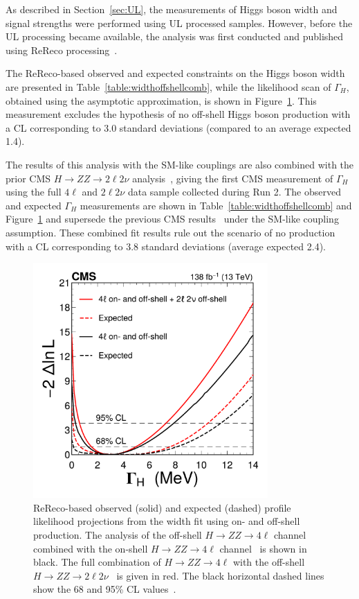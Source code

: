 As described in Section~\ref{sec:UL}, the measurements of Higgs boson width and signal strengths were performed using UL processed samples. However, before the UL processing became available, the analysis was first conducted and published using ReReco processing~\cite{PhysRevD.111.092014}. 

The ReReco-based observed and expected constraints on the Higgs boson width are presented in Table~\ref{table:widthoffshellcomb}, while the likelihood scan of $\Gamma_H$, obtained using the asymptotic approximation, is shown in Figure~\ref{fig:widthscan}. This measurement excludes the hypothesis of no off-shell Higgs boson production with a CL corresponding to 3.0 standard deviations (compared to an average expected 1.4).

The results of this analysis with the SM-like couplings are also combined with the prior CMS \offshell $H\to ZZ\to2\ell2\nu$ analysis~\cite{CMS:2022ley}, giving the first CMS measurement of $\Gamma_H$ using the full $4\ell$ and $2\ell2\nu$ data sample collected during Run 2. 
The observed and expected $\Gamma_H$ measurements are shown in Table~\ref{table:widthoffshellcomb} and Figure~\ref{fig:widthscan} and supersede the previous CMS results~\cite{CMS:2022ley} under the SM-like coupling assumption. These combined fit results rule out the scenario of no \offshell \Hboson production
with a CL corresponding to 3.8 standard deviations (average expected 2.4).

\begin{figure}[!hbt]
    \centering
    \includegraphics[width=0.8\textwidth]{figures/Figure_011.pdf}  
    \caption{
        ReReco-based observed (solid) and expected (dashed) profile likelihood projections from the \Hboson width fit using on- and off-shell production. The analysis of the off-shell $H\to ZZ\to4\ell$ channel combined with the on-shell $H\to ZZ\to4\ell$ channel~\cite{CMS:2021nnc} is shown in black. The full combination of $H\to ZZ\to4\ell$ with the off-shell $H\to ZZ\to2\ell2\nu$~\cite{CMS:2022ley} is given in red. The black horizontal dashed lines show the 68 and 95\% CL values~\cite{PhysRevD.111.092014}.}
    \label{fig:widthscan} 
\end{figure}

